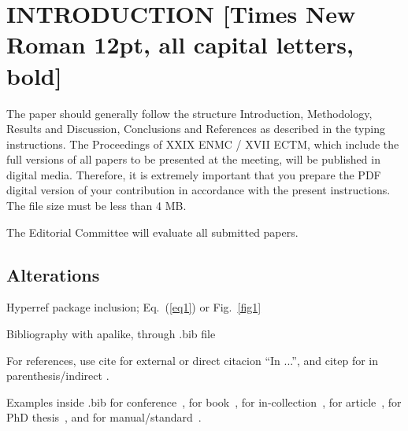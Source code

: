 \documentclass[12pt,fleqn]{article}
\renewcommand{\headrulewidth}{0pt}
\begin{document}

\renewcommand{\headrulewidth}{0pt}


\rhead{}

\pagestyle{fancy}


\section{INTRODUCTION [Times New Roman 12pt, all capital letters, bold]}

The paper should generally follow the structure Introduction, Methodology, Results and Discussion, Conclusions and References as described in the typing instructions. The Proceedings of XXIX ENMC / XVII ECTM, which include the full versions of all papers to be presented at the meeting, will be published in digital media. Therefore, it is extremely important that you prepare the PDF digital version of your contribution in accordance with the present instructions. The file size must be less than 4 MB.

The Editorial Committee will evaluate all submitted papers.

\subsection{Alterations}

Hyperref package inclusion; Eq.~(\ref{eq1}) or Fig.~\ref{fig1}

Bibliography with apalike, through .bib file

For references, use cite for external or direct citacion ``In \cite{delvecchio1992}...'', and citep for in parenthesis/indirect \citep{delvecchio1992}.

Examples inside .bib for conference~\citep{davies2008}, for book~\citep{horrocks2016}, for in-collection~\citep{linganiso2016}, for article~\citep{abhari2017}, for PhD thesis~\citep{delvecchio1992}, and for manual/standard~\cite{iso2060}.
\end{document}
